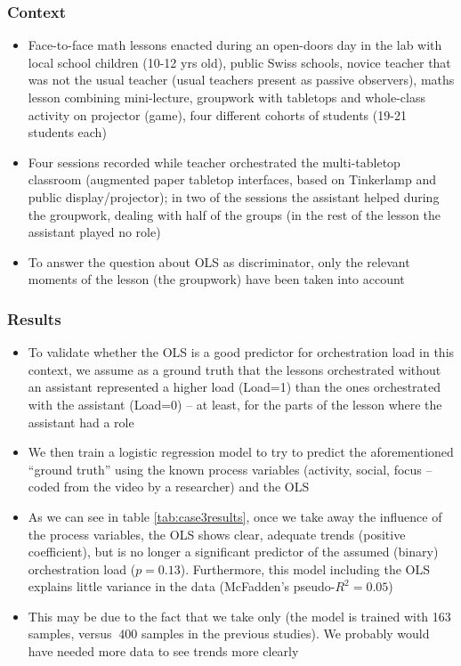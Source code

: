 \documentclass[10pt,journal,compsoc]{IEEEtran}
\begin{document}
\subsubsection{Context}

\begin{itemize}
\item Face-to-face math lessons enacted during an open-doors day in the lab with local school children (10-12 yrs old), public Swiss schools, novice teacher that was not the usual teacher (usual teachers present as passive observers), maths lesson combining mini-lecture, groupwork with tabletops and whole-class activity on projector (game), four different cohorts of students (19-21 students each) %
\item Four sessions recorded while teacher orchestrated the multi-tabletop classroom (augmented paper tabletop interfaces, based on Tinkerlamp \cite{do2012tinkerlamp} and public display/projector); in two of the sessions the assistant helped during the groupwork, dealing with half of the groups (in the rest of the lesson the assistant played no role)
\item To answer the question about OLS as discriminator, only the relevant moments of the lesson (the groupwork) have been taken into account
\end{itemize}

\subsubsection{Results}


\begin{itemize}
\item To validate whether the OLS is a good predictor for orchestration load in this context, we assume as a ground truth that the lessons orchestrated without an assistant represented a higher load (Load=1) than the ones orchestrated with the assistant (Load=0) -- at least, for the parts of the lesson where the assistant had a role 
\item We then train a logistic regression model to try to predict the aforementioned ``ground truth'' using the known process variables (activity, social, focus -- coded from the video by a researcher) and the OLS
\item As we can see in table \ref{tab:case3results}, once we take away the influence of the process variables, the OLS shows clear, adequate trends (positive coefficient), but is no longer a significant predictor of the assumed (binary) orchestration load ($p=0.13$). Furthermore, this model including the OLS explains little variance in the data (McFadden's pseudo-$R^2=0.05$) 
\item This may be due to the fact that we take only (the model is trained with 163 samples, versus $~400$ samples in the previous studies). We probably would have needed more data to see trends more clearly 
\end{itemize}
\end{document}
